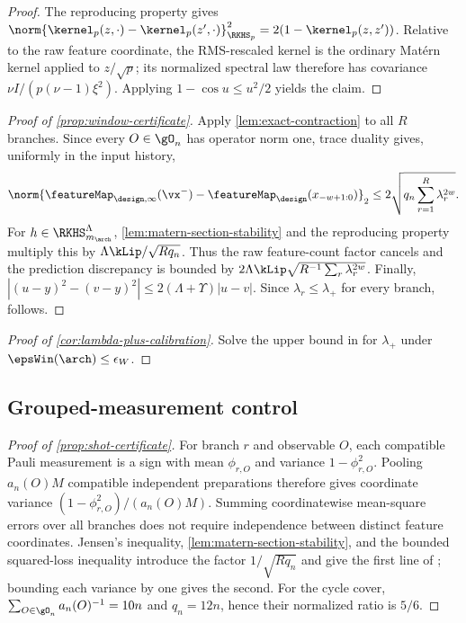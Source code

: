 \begin{proof}
The reproducing property gives
$\norm{\kernel_p(z,\cdot)-\kernel_p(z',\cdot)}_{\RKHS_p}^2
=2(1-\kernel_p(z,z'))$.  Relative to the raw feature coordinate, the
RMS-rescaled kernel is the ordinary Mat\'ern kernel applied to $z/\sqrt p$;
its normalized spectral law therefore has covariance
$\nu I/(p(\nu-1)\xi^2)$.  Applying $1-\cos u\leq u^2/2$ yields the claim.
\end{proof}

\begin{proof}[Proof of \cref{prop:window-certificate}]
Apply \cref{lem:exact-contraction} to all $R$ branches.  Since every
$O\in\gO_n$ has operator norm one, trace duality gives, uniformly in the input
history,
\[
    \norm{\featureMap_{\design,\infty}(\vx^-)
      -\featureMap_{\design}(x_{-w+1:0})}_2
    \leq2\sqrt{q_n\sum_{r=1}^{R}\lambda_r^{2w}}.
\]
For $h\in\RKHS_{m_{\arch}}^\Lambda$,
\cref{lem:matern-section-stability} and the reproducing property multiply this
by $\Lambda\kLip/\sqrt{Rq_n}$.  Thus the raw feature-count factor cancels and
the prediction discrepancy is bounded by
$2\Lambda\kLip\sqrt{R^{-1}\sum_r\lambda_r^{2w}}$.  Finally,
$|(u-y)^2-(v-y)^2|\leq2(\Lambda+\Upsilon)|u-v|$.  Since
$\lambda_r\leq\lambda_+$ for every branch, 
follows.
\end{proof}

\begin{proof}[Proof of \cref{cor:lambda-plus-calibration}]
Solve the upper bound in  for $\lambda_+$ under
$\epsWin(\arch)\leq\epsilon_W$.
\end{proof}

\subsection{Grouped-measurement control}

\begin{proof}[Proof of \cref{prop:shot-certificate}]
For branch $r$ and observable $O$, each compatible Pauli measurement is a sign
with mean $\phi_{r,O}$ and variance $1-\phi_{r,O}^2$.  Pooling $a_n(O)M$
compatible independent preparations therefore gives coordinate variance
$(1-\phi_{r,O}^2)/(a_n(O)M)$.  Summing coordinatewise mean-square errors over
all branches does not require independence between distinct feature
coordinates.  Jensen's inequality, \cref{lem:matern-section-stability}, and
the bounded squared-loss inequality introduce the factor
$1/\sqrt{Rq_n}$ and give the first line of
; bounding each variance by one gives
the second.  For the cycle cover,
$\sum_{O\in\gO_n}a_n(O)^{-1}=10n$ and $q_n=12n$, hence their normalized ratio
is $5/6$.
\end{proof}

